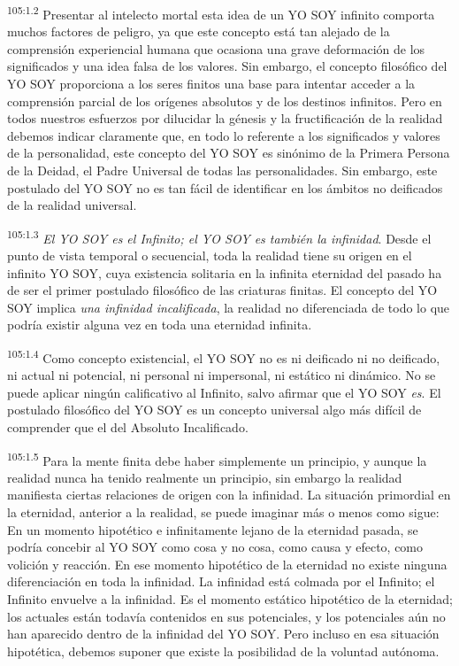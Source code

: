 \documentclass[twoside, 11pt]{book}
\begin{document}
\par
\textsuperscript{105:1.2} Presentar al intelecto mortal esta idea de un YO SOY infinito comporta muchos factores de peligro, ya que este concepto está tan alejado de la comprensión experiencial humana que ocasiona una grave deformación de los significados y una idea falsa de los valores. Sin embargo, el concepto filosófico del YO SOY proporciona a los seres finitos una base para intentar acceder a la comprensión parcial de los orígenes absolutos y de los destinos infinitos. Pero en todos nuestros esfuerzos por dilucidar la génesis y la fructificación de la realidad debemos indicar claramente que, en todo lo referente a los significados y valores de la personalidad, este concepto del YO SOY es sinónimo de la Primera Persona de la Deidad, el Padre Universal de todas las personalidades. Sin embargo, este postulado del YO SOY no es tan fácil de identificar en los ámbitos no deificados de la realidad universal.

\par
\textsuperscript{105:1.3} \textit{El YO SOY es el Infinito; el YO SOY es también la infinidad}. Desde el punto de vista temporal o secuencial, toda la realidad tiene su origen en el infinito YO SOY, cuya existencia solitaria en la infinita eternidad del pasado ha de ser el primer postulado filosófico de las criaturas finitas. El concepto del YO SOY implica \textit{una infinidad incalificada}, la realidad no diferenciada de todo lo que podría existir alguna vez en toda una eternidad infinita.

\par
\textsuperscript{105:1.4} Como concepto existencial, el YO SOY no es ni deificado ni no deificado, ni actual ni potencial, ni personal ni impersonal, ni estático ni dinámico. No se puede aplicar ningún calificativo al Infinito, salvo afirmar que el YO SOY \textit{es}. El postulado filosófico del YO SOY es un concepto universal algo más difícil de comprender que el del Absoluto Incalificado.

\par
\textsuperscript{105:1.5} Para la mente finita debe haber simplemente un principio, y aunque la realidad nunca ha tenido realmente un principio, sin embargo la realidad manifiesta ciertas relaciones de origen con la infinidad. La situación primordial en la eternidad, anterior a la realidad, se puede imaginar más o menos como sigue: En un momento hipotético e infinitamente lejano de la eternidad pasada, se podría concebir al YO SOY como cosa y no cosa, como causa y efecto, como volición y reacción. En ese momento hipotético de la eternidad no existe ninguna diferenciación en toda la infinidad. La infinidad está colmada por el Infinito; el Infinito envuelve a la infinidad. Es el momento estático hipotético de la eternidad; los actuales están todavía contenidos en sus potenciales, y los potenciales aún no han aparecido dentro de la infinidad del YO SOY. Pero incluso en esa situación hipotética, debemos suponer que existe la posibilidad de la voluntad autónoma.
\end{document}
